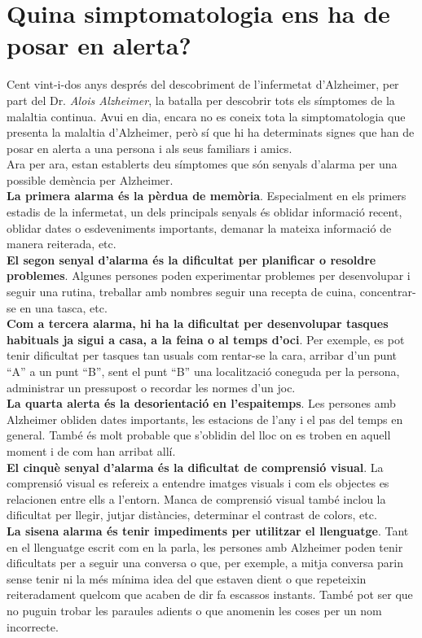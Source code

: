 \documentclass[a4paper,12pt]{report}
\begin{document}
\section*{Quina simptomatologia ens ha de posar en alerta?}
Cent vint-i-dos anys després del descobriment de l'infermetat d'Alzheimer, per part del Dr. \textit{Alois Alzheimer}, la batalla per descobrir tots els símptomes de la malaltia continua. Avui en dia, encara no es coneix tota la simptomatologia que presenta la malaltia d'Alzheimer, però sí que hi ha determinats signes que han de posar en alerta a una persona i als seus familiars i amics.\\
Ara per ara, estan establerts deu símptomes que són senyals d'alarma per una possible demència per Alzheimer.\\
\textbf{La primera alarma és la pèrdua de memòria}. Especialment en els primers estadis de la infermetat, un dels principals senyals és oblidar informació recent, oblidar dates o esdeveniments importants, demanar la mateixa informació de manera reiterada, etc.\\
\textbf{El segon senyal d'alarma és la dificultat per planificar o resoldre problemes}. Algunes persones poden experimentar problemes per desenvolupar i seguir una rutina, treballar amb nombres seguir una recepta de cuina, concentrar-se en una tasca, etc.\\
\textbf{Com a tercera alarma, hi ha la dificultat per desenvolupar tasques habituals ja sigui a casa, a la feina o al temps d'oci}. Per exemple, es pot tenir dificultat per tasques tan usuals com rentar-se la cara, arribar d'un punt “A” a un punt “B”, sent el punt “B” una localització coneguda per la persona, administrar un pressupost o recordar les normes d'un joc.\\
\textbf{La quarta alerta és la desorientació en l'espaitemps}. Les persones amb Alzheimer obliden dates importants, les estacions de l'any i el pas del temps en general. També és molt probable que s'oblidin del lloc on es troben en aquell moment i de com han arribat allí.\\
\textbf{El cinquè senyal d'alarma és la dificultat de comprensió visual}. La comprensió visual es refereix a entendre imatges visuals i com els objectes es relacionen entre ells a l'entorn. Manca de comprensió visual també inclou la dificultat per llegir, jutjar distàncies, determinar el contrast de colors, etc.\\
\textbf{La sisena alarma és tenir impediments per utilitzar el llenguatge}. Tant en el llenguatge escrit com en la parla, les persones amb Alzheimer poden tenir dificultats per a seguir una conversa o que, per exemple, a mitja conversa parin sense tenir ni la més mínima idea del que estaven dient o que repeteixin reiteradament quelcom que acaben de dir fa escassos instants. També pot ser que no puguin trobar les paraules adients o que anomenin les coses per un nom incorrecte.\\
\end{document}
